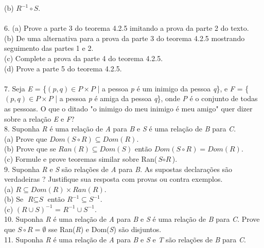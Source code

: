 (b) $\textit{R}^{-1} \circ \textit{S}$.
\\
\\
6. (a) Prove a parte 3 do teorema 4.2.5 imitando a prova da parte 2 do texto.
\\

(b) De uma alternativa para a prova da parte 3 do teorema 4.2.5 mostrando seguimento das partes 1 e 2.
\\

(c) Complete a prova da parte 4 do teorema 4.2.5.
\\

(d) Prove a parte 5 do teorema 4.2.5.
\\
\\
7. Seja \textit{E} = \{$(\textit{p}, \textit{q}) \in \textit{P} \times \textit{P}$ | a pessoa \textit{p} é um inimigo da pessoa \textit{q}\}, e \textit{F} = \{$(\textit{p}, \textit{q}) \in \textit{P} \times \textit{P}$ | a pessoa \textit{p} é amiga da pessoa \textit{q}\}, onde \textit{P} é o conjunto de todas as pessoas. O que o ditado "o inimigo do meu inimigo é meu amigo" quer dizer sobre a relação \textit{E} e \textit{F}? 
\\
8. Suponha \textit{R} é uma relação de \textit{A} para \textit{B} e \textit{S} é uma relação de \textit{B} para \textit{C}.
\\

(a) Prove que $Dom(\textit{S} \circ \textit{R}) \subseteq Dom(\textit{R})$.
\\

(b) Prove que se $Ran(\textit{R}) \subseteq Dom(\textit{S})$ então $Dom(\textit{S} \circ \textit{R}) = Dom(\textit{R})$.
\\

(c) Formule e prove teoremas similar sobre Ran($\textit{S} \circ \textit{R}$).
\\
9. Suponha \textit{R} e \textit{S} são relações de \textit{A} para \textit{B}. As supostas declarações são verdadeiras ? Justifique sua resposta com provas ou contra exemplos.
\\
 
(a) $\textit{R} \subseteq Dom(\textit{R}) \times Ran(\textit{R})$.
\\

(b) Se $\textit{R} \subseteq \textit{S}$ então $\textit{R}^{-1} \subseteq \textit{S}^{-1}$. 
\\

(c) $(\textit{R} \cup \textit{S})^{-1}$ = $\textit{R}^{-1} \cup \textit{S}^{-1}$.
\\
10. Suponha \textit{R} é uma relação de \textit{A} para \textit{B} e \textit{S} é uma relação de \textit{B} para \textit{C}. Prove que $\textit{S} \circ \textit{R} = \emptyset$ sse Ran(\textit{R}) e Dom(\textit{S}) são disjuntos.
\\
11. Suponha \textit{R} é uma relação  de \textit{A} para \textit{B} e \textit{S} e \textit{T} são relações de \textit{B} para \textit{C}.
\\

